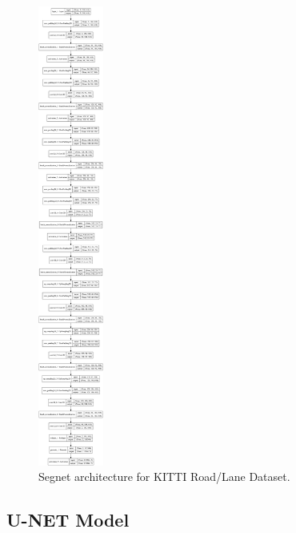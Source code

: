 \documentclass[10pt,twocolumn,letterpaper]{article}
\begin{document}
\begin{figure}[ht]
  \centering
  \includegraphics[width=0.19\textwidth]{kitti_segnet_plot.png}
  \caption{Segnet architecture for KITTI Road/Lane Dataset.}
  \label{fig:segnet_model}
\end{figure}

\subsection{U-NET Model} \label{ssec:unet_model}
\end{document}
